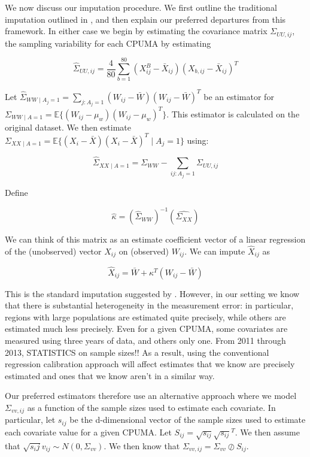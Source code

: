 \documentclass[12pt]{article}
\begin{document}
We now discuss our imputation procedure. We first outline the traditional imputation outlined in \cite{carroll2006measurement}, and then explain our preferred departures from this framework. In either case we begin by estimating the covariance matrix $\Sigma_{UU, ij}$, the sampling variability for each CPUMA by estimating

$$
\hat{\Sigma}_{UU, ij} = \frac{4}{80}\sum_{b=1}^{80}(X_{ij}^B - \bar{X}_{ij})(X_{b, ij} - \bar{X}_{ij})^T
$$

Let $\hat{\Sigma}_{WW \mid A_j = 1} = \sum_{j: A_j = 1} (W_{ij} - \bar{W})(W_{ij} - \bar{W})^T$ be an estimator for $\Sigma_{WW \mid A = 1} = \mathbb{E}\{(W_{ij} - \mu_w)(W_{ij} - \mu_w)^T\}$. This estimator is calculated on the original dataset. We then estimate $\Sigma_{XX \mid A = 1} = \mathbb{E}\{(X_i - \bar{X})(X_i - \bar{X})^T \mid A_j = 1\}$ using:

$$
\hat{\Sigma}_{XX \mid A = 1} = \Sigma_{WW} - \sum_{ij: A_j = 1} \Sigma_{UU, ij}
$$

Define

$$
\hat{\kappa} = (\hat{\Sigma}_{WW})^{-1}(\hat{\Sigma_{XX}})
$$

We can think of this matrix as an estimate coefficient vector of a linear regression of the (unobserved) vector $X_{ij}$ on (observed) $W_{ij}$. We can impute $\hat{X}_{ij}$ as

$$
\hat{X}_{ij} = \bar{W} + \kappa^T(W_{ij} - \bar{W})
$$

This is the standard imputation suggested by \cite{carroll2006measurement}. However, in our setting we know that there is substantial heterogeneity in the measurement error: in particular, regions with large populations are estimated quite precisely, while others are estimated much less precisely. Even for a given CPUMA, some covariates are measured using three years of data, and others only one. From 2011 through 2013, STATISTICS on sample sizes!! As a result, using the conventional regression calibration approach will affect estimates that we know are precisely estimated and ones that we know aren't in a similar way. 

Our preferred estimators therefore use an alternative approach where we model $\Sigma_{vv, ij}$ as a function of the sample sizes used to estimate each covariate. In particular, let $s_{ij}$ be the d-dimensional vector of the sample sizes used to estimate each covariate value for a given CPUMA. Let $S_{ij} = \sqrt{s_{ij}}\sqrt{s_{ij}}^T$. We then assume that $\sqrt{s_ij}v_{ij} \sim N(0, \Sigma_{vv})$. We then know that $\Sigma_{vv, ij} = \Sigma_{vv} \oslash S_{ij}$. 
\end{document}
